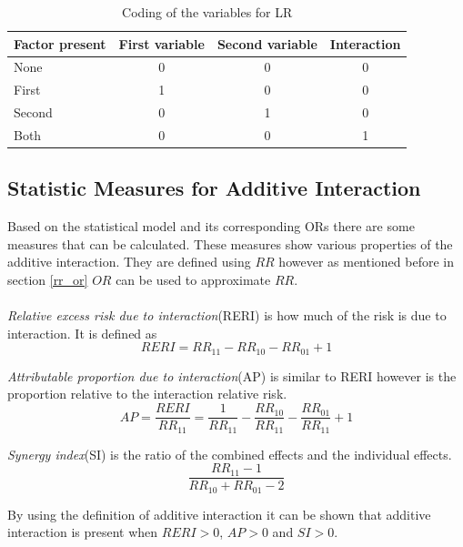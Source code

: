 \documentclass[10pt,a4paper]{report}
\begin{document}
\begin{table}[h]
\begin{tabular}{| l | c c c|}
  \hline
  Factor present & First variable & Second variable & Interaction \\
  \hline
  None & 0 & 0 & 0 \\
  \hline 
  First & 1 & 0 & 0 \\
  \hline
  Second & 0 & 1 & 0 \\
  \hline
  Both & 0 & 0 & 1 \\
  \hline
\end{tabular}
\caption{Coding of the variables for LR}
\label{table:coding}
\end{table}

\subsection{Statistic Measures for Additive Interaction}
Based on the statistical model and its corresponding ORs there are some measures that can be calculated. These measures show various properties of the additive interaction. They are defined using $RR$ however as mentioned before in section \ref{rr_or} $OR$ can be used to approximate $RR$.\\
\\
\emph{Relative  excess risk due to interaction}(RERI) is how much of the risk is due to interaction\cite{rothman2008modern, recoding_2011}. It is defined as\cite{rothman2008modern, recoding_2011}
\begin{equation}
RERI=RR_{11}-RR_{10}-RR_{01}+1
\end{equation}

\emph{Attributable proportion due to interaction}(AP) is similar to RERI however is the proportion relative to the interaction relative risk\cite{rothman2008modern, recoding_2011}.
\begin{equation}
AP=\frac{RERI}{RR_{11}}=\frac{1}{RR_{11}}-\frac{RR_{10}}{RR_{11}}-\frac{RR_{01}}{RR_{11}}+1
\end{equation}

\emph{Synergy index}(SI) is the ratio of the combined effects and the individual effects\cite{rothman2008modern, recoding_2011}.
\begin{equation}
\frac{RR_{11}-1}{RR_{10}+RR_{01}-2}
\end{equation}

By using the definition of additive interaction it can be shown that additive interaction is present when $RERI>0$, $AP>0$ and $SI>0$\cite{recoding_2011}.
\end{document}
